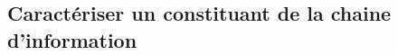 \subsection{Caractériser un constituant de la chaine d’information}

\renewcommand{\repExo}{../../ExercicesCompetences/A3_AnalyseFonctionnelleStructurelle/A3_06_ChaineInfo}


\renewcommand{\td}{50_BancBalafre}
\graphicspath{{\repStyle/png/}{\repExo/\td/images/}}
